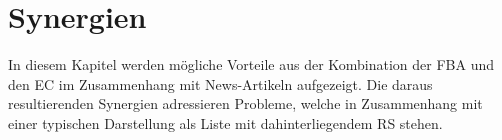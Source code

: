 \section{Synergien}
In diesem Kapitel werden mögliche Vorteile aus der Kombination der \ac{FBA} und den \ac{EC} im Zusammenhang mit News-Artikeln aufgezeigt.
Die daraus resultierenden Synergien adressieren Probleme, welche in Zusammenhang mit einer typischen Darstellung als Liste mit dahinterliegendem \ac{RS} stehen.




